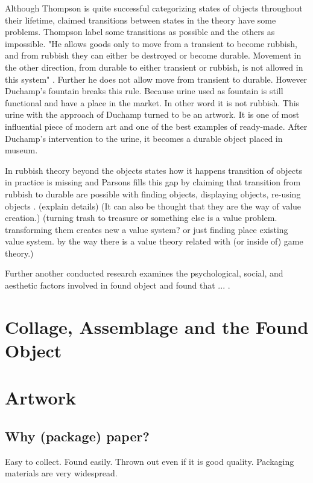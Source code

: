 \documentclass{article}
\begin{document}
Although Thompson is quite successful categorizing states of objects throughout their lifetime, claimed transitions between states in the theory have some problems. Thompson label some transitions as possible and the others as impossible. "He allows goods only to move from a transient to become rubbish, and from rubbish they can either be destroyed or become durable. Movement in the other direction, from durable to either transient or rubbish, is not allowed in this system" \cite{meadow2011relocation}. Further he does not allow move from transient to durable. However Duchamp's fountain breaks this rule. Because urine used as fountain is still functional and have a place in the market. In other word it is not rubbish. This urine with the approach of Duchamp turned to be an artwork. It is one of most influential piece of modern art and one of the best examples of ready-made. After Duchamp's intervention to the urine, it becomes a durable object placed in museum.

In rubbish theory beyond the objects states how it happens transition of objects in practice is missing and Parsons fills this gap by claiming that transition from rubbish to durable are possible with finding objects, displaying objects, re-using objects \cite{parsons2008thompsons}. (explain details) (It can also be thought that they are the way of value creation.) (turning trash to treasure or something else is a value problem. transforming them creates new a value system? or just finding place existing value system. by the way there is a value theory related with (or inside of) game theory.)

Further another conducted research examines the psychological, social, and aesthetic factors involved in found object and found that ... \cite{camic2010trashed}.

\section{Collage, Assemblage and the Found Object}

\section{Artwork}
\subsection{Why (package) paper?}
Easy to collect. Found easily. Thrown out even if it is good quality. Packaging materials are very widespread.



\end{document}
